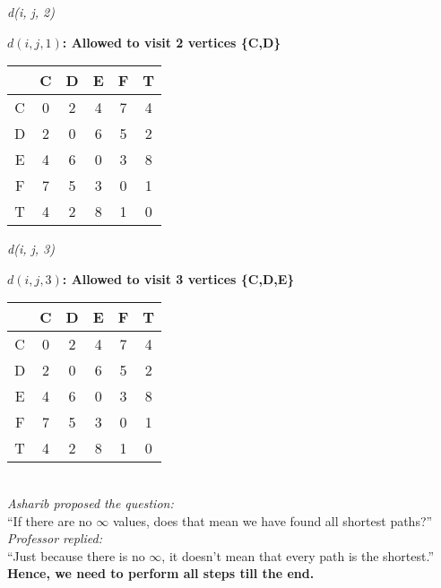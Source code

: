 \begin{frame}{\textit{d(i, j, 2)}}

\centering

\vspace{1em}

\textbf{$d(i, j, 1)$: Allowed to visit 2 vertices {\textcolor{myNewColorA}{\{C,D\}}}}

\begin{tabular}{c|ccccc}
     & C & D & E & F & T \\
    \hline
  C & 0 & 2 & 4 & 7 & 4 \\
  D & 2 & 0 & 6 & 5 & 2 \\
  E & 4 & 6 & 0 & 3 & 8 \\
  F & 7 & 5 & 3 & 0 & 1 \\
  T & 4 & 2 & 8 & 1 & 0 \\
\end{tabular}

\vspace{1em}

\textcolor{gray}{}



\end{frame}

\begin{frame}{\textit{d(i, j, 3)}}

\centering

\vspace{1em}

\textbf{$d(i, j, 3)$: Allowed to visit 3 vertices {\textcolor{myNewColorA}{\{C,D,E\}}}}

\begin{tabular}{c|ccccc}
     & C & D & E & F & T \\
    \hline
    C & 0 & 2 & 4 & 7 & 4 \\
    D & 2 & 0 & 6 & 5 & 2 \\
    E & 4 & 6 & 0 & 3 & 8 \\
    F & 7 & 5 & 3 & 0 & 1 \\
    T & 4 & 2 & 8 & 1 & 0 \\
\end{tabular}

\vspace{1em}

\textcolor{gray}{}\\
\vspace{1em}
\textit{Asharib proposed the question:} \\
\textquotedblleft If there are no $\infty$ values, does that mean we have found all shortest paths?\textquotedblright \\[1em]

\textit{Professor replied:} \\
\textquotedblleft Just because there is no $\infty$, it doesn't mean that every path is the shortest.\textquotedblright \\[1em]

\textbf{Hence, we need to perform all steps till the end.}
\end{frame}




